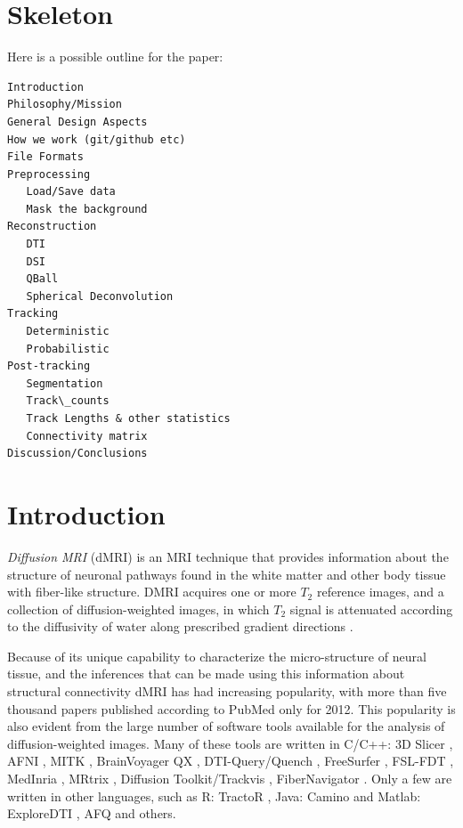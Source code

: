 \documentclass{bioinfo}
\begin{document}
\section{Skeleton}
Here is a possible outline for the paper:
\begin{verbatim}
Introduction
Philosophy/Mission
General Design Aspects
How we work (git/github etc)
File Formats
Preprocessing
   Load/Save data
   Mask the background
Reconstruction
   DTI
   DSI
   QBall
   Spherical Deconvolution
Tracking
   Deterministic
   Probabilistic
Post-tracking
   Segmentation
   Track\_counts
   Track Lengths & other statistics
   Connectivity matrix
Discussion/Conclusions
\end{verbatim}

\section{Introduction}

\emph{Diffusion MRI} (dMRI) \citep{stejskal-tanner:65,
  lebihan-breton:85,merboldt-hanicke-etal:85, taylor-bushell:85, callaghan:91}
is an MRI technique that provides information about the structure of neuronal pathways found in the white matter and other body tissue with fiber-like structure. DMRI acquires one or more $T_{2}$ reference images, and a collection of diffusion-weighted images, in which $T_{2}$ signal is attenuated according to the  diffusivity of water along prescribed gradient directions \citep{behrens-johansen-berg:09, jones:10}.

Because of its unique capability to characterize the micro-structure of neural tissue, and the inferences that can be made using this information about structural connectivity dMRI has had increasing popularity, with more than five thousand papers published according to PubMed only for 2012. This popularity is also evident from the large number of software tools available for the analysis of diffusion-weighted images. Many of these tools are written in C/C++: 3D Slicer \citep{pieper:06}, AFNI \citep{cox-afni:12}, MITK \citep{fritzsche-mitk:12}, BrainVoyager QX \citep{goebel-brainvoyager:12}, DTI-Query/Quench \citep{sherbondy:05}, FreeSurfer \citep{fischl-freesurfer:12}, FSL-FDT \citep{smith-fdt:04}, MedInria \citep{toussaint-souplet-etal:07}, MRtrix \citep{Tournier2012}, Diffusion Toolkit/Trackvis \citep{wang-diffusion-toolkit:07}, FiberNavigator \citep{vaillancourt:11, chamberland:13}. Only a few are written in other languages, such as R: TractoR \citep{ clayden-TractoR:11}, Java: Camino \citep{Cook2006} and Matlab: ExploreDTI \citep{leemans-exploredti:09}, AFQ \citep{yeatman2012afq} and others.
\end{document}
